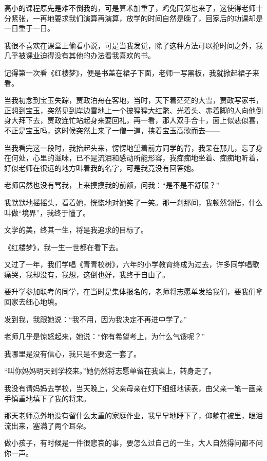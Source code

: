 \par 高小的课程原先是难不倒我的，可是算术加重了，鸡兔同笼也来了，这使得老师十分紧张，一再地要求我们演算再演算，放学的时间自然是晚了，回家后的功课却是一日重于一日。
\par 我很不喜欢在课堂上偷看小说，可是当我发觉，除了这种方法可以抢时间之外，我几乎被课业迫得没有其他的办法看我喜欢的书。
\par 记得第一次看《红楼梦》，便是书盖在裙子下面，老师一写黑板，我就掀起裙子来看。
\par 当我初念到宝玉失踪，贾政泊舟在客地，当时，天下着茫茫的大雪，贾政写家书，正想到宝玉，突然见到岸边雪地上一个披猩猩大红氅、光着头、赤着脚的人向他倒身大拜下去，贾政连忙站起身来要回礼，再一看，那人双手合十，面上似悲似喜，不正是宝玉吗，这时候突然上来了一僧一道，挟着宝玉高歌而去——
\par 当我看完这一段时，我抬起头来，愣愣地望着前方同学的背，我呆在那儿，忘了身在何处，心里的滋味，已不是流泪和感动所能形容，我痴痴地坐着、痴痴地听着，好似老师在很远的地方叫着我的名字，可是我竟没有回答她。
\par 老师居然也没有骂我，上来摸摸我的前额，问我：“是不是不舒服？”
\par 我默默地摇摇头，看着她，恍惚地对她笑了一笑。那一刹那间，我顿然领悟，什么叫做“境界”，我终于懂了。
\par 文学的美，终其一生，将是我追求的目标了。
\par 《红楼梦》，我一生一世都在看下去。
\par 又过了一年，我们学唱《青青校树》，六年的小学教育终成为过去，许多同学唱歌痛哭，我却没有，我想，这倒也好，我终于自由了。
\par 要升学参加联考的同学，在当时是集体报名的，老师将志愿单发给我们，要我们拿回家去细心地填。
\par 发到我，我跟她说：“我不用，因为我决定不再进中学了。”
\par 老师几乎是惊怒起来，她说：“你有希望考上，为什么气馁呢？”
\par 我哪里是没有信心，我只是不要这一套了。
\par “叫你妈妈明天到学校来。”她仍然将志愿单留在我桌上，转身走了。
\par 我没有请妈妈去学校，当天晚上，父亲母亲在灯下细细地读表，由父亲一笔一画亲手慎重地填下了我的将来。
\par 那天老师意外地没有留什么太重的家庭作业，我早早地睡下了，仰躺在被里，眼泪流出来，塞满了两个耳朵。
\par 做小孩子，有时候是一件很悲哀的事，要怎么过自己的一生，大人自然得问都不问你一声。
